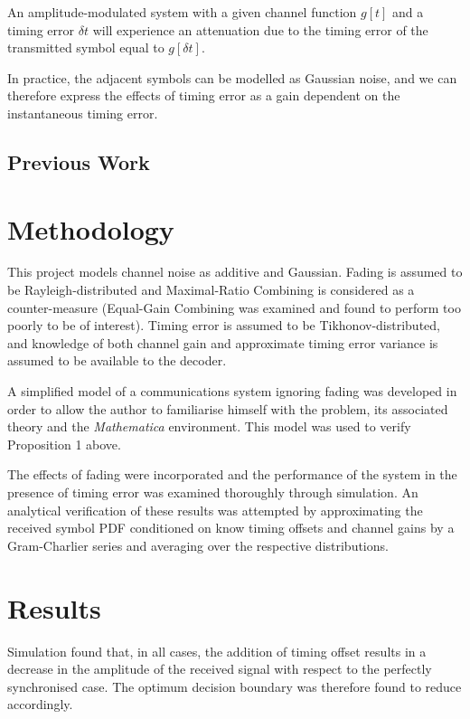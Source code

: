 \begin{propo}
An amplitude-modulated system with a given channel function $g[t]$ and a timing error $\delta t$ will experience an attenuation due to the timing error of the transmitted symbol equal to $g[\delta t]$.
\end{propo}

In practice, the adjacent symbols can be modelled as Gaussian noise, and we can therefore express the effects of timing error as a gain dependent on the instantaneous timing error. 

\section{Previous Work}


\chapter{Methodology}

This project models channel noise as additive and Gaussian. Fading is assumed to be Rayleigh-distributed and Maximal-Ratio Combining is considered as a counter-measure (Equal-Gain Combining was examined and found to perform too poorly to be of interest). Timing error is assumed to be Tikhonov-distributed, and knowledge of both channel gain and approximate timing error variance is assumed to be available to the decoder.

A simplified model of a communications system ignoring fading was developed in order to allow the author to familiarise himself with the problem, its associated theory and the \emph{Mathematica} environment. This model was used to verify Proposition 1 above.

The effects of fading were incorporated and the performance of the system in the presence of timing error was examined thoroughly through simulation. An analytical verification of these results was attempted by approximating the received symbol PDF conditioned on know timing offsets and channel gains by a Gram-Charlier series and averaging over the respective distributions.

\chapter{Results}

Simulation found that, in all cases, the addition of timing offset results in a decrease in the amplitude of the received signal with respect to the perfectly synchronised case. The optimum decision boundary was therefore found to reduce accordingly.

